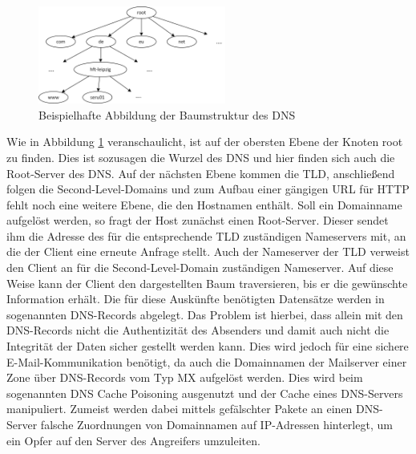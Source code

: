 \documentclass  [paper=a4,
				fontsize=12pt,
				listof=totoc,
				bibliography=totoc
				]{scrreprt}
\begin{document}
		\begin{figure}
			\vspace{-12pt}
			\centering
			\includegraphics[width=0.55\textwidth]{images/Baumstruktur_DNS.png}
			\caption[Baumstruktur des DNS]{Beispielhafte Abbildung der Baumstruktur des \ac{DNS}\footnotemark}
			\label{img:baumstruktur_dns}
			\vspace{-12pt}
		\end{figure}
		
		Wie in Abbildung \ref{img:baumstruktur_dns} veranschaulicht, ist auf der obersten Ebene der Knoten \glqq root\grqq{} zu finden.
		Dies ist sozusagen die Wurzel des \ac{DNS} und hier finden sich auch die Root-Server des \ac{DNS}.
		Auf der nächsten Ebene kommen die \ac{TLD}, anschließend folgen die Second-Level-Domains und zum Aufbau einer gängigen \ac{URL} für \ac{HTTP} fehlt noch eine weitere Ebene, die den Hostnamen enthält.
		Soll ein Domainname aufgelöst werden, so fragt der Host zunächst einen Root-Server.
		Dieser sendet ihm die Adresse des für die entsprechende \ac{TLD} zuständigen Nameservers mit, an die der Client eine erneute Anfrage stellt.
		Auch der Nameserver der \ac{TLD} verweist den Client an für die Second-Level-Domain zuständigen Nameserver.
		Auf diese Weise kann der Client den dargestellten Baum traversieren, bis er die gewünschte Information erhält.
		Die für diese Auskünfte benötigten Datensätze werden in sogenannten \ac{DNS}-Records abgelegt.
		Das Problem ist hierbei, dass allein mit den \ac{DNS}-Records nicht die Authentizität des Absenders und damit auch nicht die Integrität der Daten sicher gestellt werden kann.
		Dies wird jedoch für eine sichere E-Mail-Kommunikation benötigt, da auch die Domainnamen der Mailserver einer Zone über \ac{DNS}-Records vom Typ \glqq MX\grqq{} aufgelöst werden.
		Dies wird beim sogenannten \ac{DNS} Cache Poisoning ausgenutzt und der Cache eines \ac{DNS}-Servers manipuliert.
		Zumeist werden dabei mittels gefälschter Pakete an einen \ac{DNS}-Server falsche Zuordnungen von Domainnamen auf \ac{IP}-Adressen hinterlegt, um ein Opfer auf den Server des Angreifers umzuleiten.
		
\end{document}
